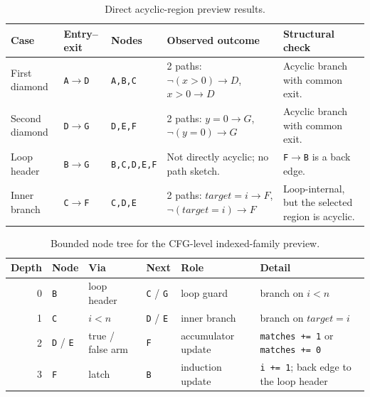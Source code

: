 \documentclass[conference]{IEEEtran}
\newcommand{\tighttable}{\scriptsize\renewcommand{\arraystretch}{1.16}}
\begin{document}
\begin{table}[H]
\caption{Direct acyclic-region preview results.}
\label{tab:region-preview-outcomes}
\centering
\tighttable
\begin{tabularx}{\textwidth}{@{}lllY Y@{}}
\toprule
Case & Entry--exit & Nodes & Observed outcome & Structural check \\
\midrule
First diamond
& \texttt{A}\(\to\)\texttt{D} & \texttt{A,B,C}
& 2 paths: \(\lnot(x > 0) \rightarrow D\), \(x > 0 \rightarrow D\)
& Acyclic branch with common exit. \\
Second diamond
& \texttt{D}\(\to\)\texttt{G} & \texttt{D,E,F}
& 2 paths: \(y = 0 \rightarrow G\), \(\lnot(y = 0) \rightarrow G\)
& Acyclic branch with common exit. \\
Loop header
& \texttt{B}\(\to\)\texttt{G} & \texttt{B,C,D,E,F}
& Not directly acyclic; no path sketch.
& \texttt{F}\(\to\)\texttt{B} is a back edge. \\
Inner branch
& \texttt{C}\(\to\)\texttt{F} & \texttt{C,D,E}
& 2 paths: \(\mathit{target} = i \rightarrow F\), \(\lnot(\mathit{target} = i) \rightarrow F\)
& Loop-internal, but the selected region is acyclic. \\
\bottomrule
\end{tabularx}
\end{table}

\begin{table}[H]
\caption{Bounded node tree for the CFG-level indexed-family preview.}
\label{tab:quantified-node-tree}
\centering
\tighttable
\begin{tabularx}{\textwidth}{@{}rllllY@{}}
\toprule
Depth & Node & Via & Next & Role & Detail \\
 & \texttt{B} & loop header & \texttt{C} / \texttt{G}
& loop guard & branch on \(i < n\) \\
1 & \texttt{C} & \(i < n\) & \texttt{D} / \texttt{E}
& inner branch & branch on \(\mathit{target} = i\) \\
2 & \texttt{D} / \texttt{E} & true / false arm & \texttt{F}
& accumulator update & \texttt{matches += 1} or \texttt{matches += 0} \\
3 & \texttt{F} & latch & \texttt{B}
& induction update & \texttt{i += 1}; back edge to the loop header \\
\bottomrule
\end{tabularx}
\end{table}
\end{document}
